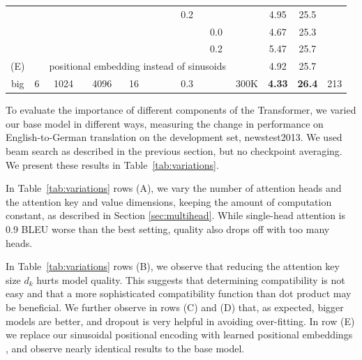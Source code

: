 \documentclass{article}
\newcommand\todo[1]{\textcolor{red}{[[#1]]}}
\begin{document}
\begin{table}[t]
\begin{center}
\begin{tabular}{c|ccccccccc|ccc}
& & & & & & & 0.2 & & & 4.95 & 25.5 &  \\
& & & & & & & & 0.0 & & 4.67 & 25.3 &  \\
& & & & & & & & 0.2 & & 5.47 & 25.7 &  \\
\hline\rule{0pt}{2.0ex}
(E) & & \multicolumn{7}{c}{positional embedding instead of sinusoids} & & 4.92 & 25.7 & \\
\hline\rule{0pt}{2.0ex}
big & 6 & 1024 & 4096 & 16 & & & 0.3 & & 300K & \textbf{4.33} & \textbf{26.4} & 213 \\
\hline
\end{tabular}
\end{center}
\end{table}



To evaluate the importance of different components of the Transformer, we varied our base model in different ways, measuring the change in performance on English-to-German translation on the development set, newstest2013. We used beam search as described in the previous section, but no checkpoint averaging.  We present these results in Table~\ref{tab:variations}.  

In Table~\ref{tab:variations} rows (A), we vary the number of attention heads and the attention key and value dimensions, keeping the amount of computation constant, as described in Section \ref{sec:multihead}. While single-head attention is 0.9 BLEU worse than the best setting, quality also drops off with too many heads.

In Table~\ref{tab:variations} rows (B), we observe that reducing the attention key size $d_k$ hurts model quality. This suggests that determining compatibility is not easy and that a more sophisticated compatibility function than dot product may be beneficial. We further observe in rows (C) and (D) that, as expected, bigger models are better, and dropout is very helpful in avoiding over-fitting.  In row (E) we replace our sinusoidal positional encoding with learned positional embeddings \citep{JonasFaceNet2017}, and observe nearly identical results to the base model.
\end{document}
